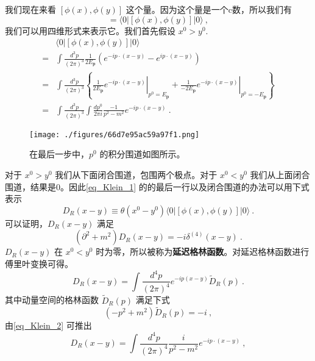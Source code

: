 我们现在来看 $[\phi(x),\phi(y)]$ 这个量。因为这个量是一个c数，所以我们有
\begin{equation}
[\phi(x),\phi(y)] = \langle 0 | [\phi(x),\phi(y)] | 0 \rangle~,
\end{equation}
我们可以用四维形式来表示它。我们首先假设 $x^0>y^0$.
\begin{equation}\label{eq_Klein_1}
\begin{aligned}
& \langle 0|[\phi(x), \phi(y)]| 0\rangle\\
=&\int \frac{d^{3} p}{(2 \pi)^{3}} \frac{1}{2 E_{\mathbf{p}}}\left(e^{-i p \cdot(x-y)}-e^{i p \cdot(x-y)}\right) \\ 
=& \int \frac{d^{3} p}{(2 \pi)^{3}}\left\{\left.\frac{1}{2 E_{\mathbf{p}}} e^{-i p \cdot(x-y)}\right|_{p^{0}=E_{\mathbf{p}}}+\left.\frac{1}{-2 E_{\mathbf{p}}} e^{-i p \cdot(x-y)}\right|_{p^{0}=-E_{\mathbf{p}}}\right\} \\
=& \int \frac{d^{3} p}{(2 \pi)^{3}} \int \frac{d p^{0}}{2 \pi i} \frac{-1}{p^{2}-m^{2}} e^{-i p \cdot(x-y)} ~.
\end{aligned}
\end{equation}
\begin{figure}[ht]
\centering
\texttt{[image: ./figures/66d7e95ac59a97f1.png]}
\caption{在最后一步中，$p^0$ 的积分围道如图所示。} \label{fig_Klein_1}
\end{figure}
对于 $x^0>y^0$ 我们从下面闭合围道，包围两个极点。对于 $x^0<y^0$ 我们从上面闭合围道，结果是0。因此\autoref{eq_Klein_1} 的的最后一行以及闭合围道的办法可以用下式表示
\begin{equation}
D_R(x-y)\equiv \theta(x^0-y^0)\langle 0 | [\phi(x),\phi(y)]|0 \rangle~.
\end{equation}
可以证明，$D_R(x-y)$ 满足
\begin{equation}
(\partial^2+m^2)D_R(x-y) = -i \delta^{(4)}(x-y)~.
\end{equation}
$D_R(x-y)$ 在 $x^0<y^0$ 时为零，所以被称为\textbf{延迟格林函数}。对延迟格林函数进行傅里叶变换可得。
\begin{equation}
D_R(x-y) = \int \frac{d^4p}{(2\pi)^4} e^{-ip(x-y)} \tilde D_R (p)~.
\end{equation}
其中动量空间的格林函数 $\tilde D_R(p)$ 满足下式
\begin{equation}\label{eq_Klein_2}
(-p^2+m^2) \tilde D_R(p) = -i~,
\end{equation}
由\autoref{eq_Klein_2} 可推出
\begin{equation}
D_R (x-y) = \int \frac{d^4p}{(2\pi)^4} \frac{i}{p^2-m^2} e^{-ip\cdot(x-y)}~,
\end{equation}
